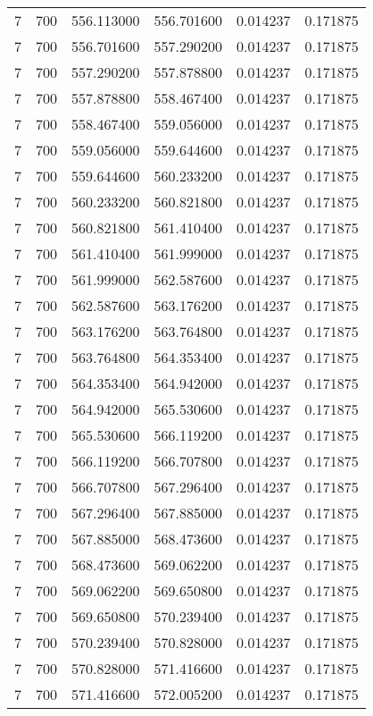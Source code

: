 \begin{longtable}{rrrrrr}
7 & 700 & 556.113000 & 556.701600 & 0.014237 & 0.171875 \\
7 & 700 & 556.701600 & 557.290200 & 0.014237 & 0.171875 \\
7 & 700 & 557.290200 & 557.878800 & 0.014237 & 0.171875 \\
7 & 700 & 557.878800 & 558.467400 & 0.014237 & 0.171875 \\
7 & 700 & 558.467400 & 559.056000 & 0.014237 & 0.171875 \\
7 & 700 & 559.056000 & 559.644600 & 0.014237 & 0.171875 \\
7 & 700 & 559.644600 & 560.233200 & 0.014237 & 0.171875 \\
7 & 700 & 560.233200 & 560.821800 & 0.014237 & 0.171875 \\
7 & 700 & 560.821800 & 561.410400 & 0.014237 & 0.171875 \\
7 & 700 & 561.410400 & 561.999000 & 0.014237 & 0.171875 \\
7 & 700 & 561.999000 & 562.587600 & 0.014237 & 0.171875 \\
7 & 700 & 562.587600 & 563.176200 & 0.014237 & 0.171875 \\
7 & 700 & 563.176200 & 563.764800 & 0.014237 & 0.171875 \\
7 & 700 & 563.764800 & 564.353400 & 0.014237 & 0.171875 \\
7 & 700 & 564.353400 & 564.942000 & 0.014237 & 0.171875 \\
7 & 700 & 564.942000 & 565.530600 & 0.014237 & 0.171875 \\
7 & 700 & 565.530600 & 566.119200 & 0.014237 & 0.171875 \\
7 & 700 & 566.119200 & 566.707800 & 0.014237 & 0.171875 \\
7 & 700 & 566.707800 & 567.296400 & 0.014237 & 0.171875 \\
7 & 700 & 567.296400 & 567.885000 & 0.014237 & 0.171875 \\
7 & 700 & 567.885000 & 568.473600 & 0.014237 & 0.171875 \\
7 & 700 & 568.473600 & 569.062200 & 0.014237 & 0.171875 \\
7 & 700 & 569.062200 & 569.650800 & 0.014237 & 0.171875 \\
7 & 700 & 569.650800 & 570.239400 & 0.014237 & 0.171875 \\
7 & 700 & 570.239400 & 570.828000 & 0.014237 & 0.171875 \\
7 & 700 & 570.828000 & 571.416600 & 0.014237 & 0.171875 \\
7 & 700 & 571.416600 & 572.005200 & 0.014237 & 0.171875 \\

\end{longtable}
